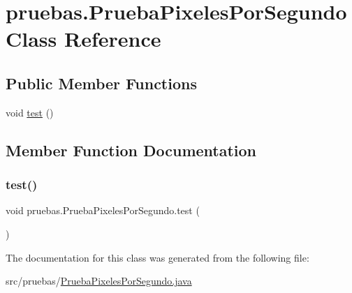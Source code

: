 \hypertarget{classpruebas_1_1_prueba_pixeles_por_segundo}{}\section{pruebas.\+Prueba\+Pixeles\+Por\+Segundo Class Reference}
\label{classpruebas_1_1_prueba_pixeles_por_segundo}
\subsection*{Public Member Functions}
\begin{DoxyCompactItemize}
\item 
void \hyperlink{classpruebas_1_1_prueba_pixeles_por_segundo_ae2ecca9d97a1b65fba11b07b8313a8d7}{test} ()
\end{DoxyCompactItemize}


\subsection{Member Function Documentation}
\hypertarget{classpruebas_1_1_prueba_pixeles_por_segundo_ae2ecca9d97a1b65fba11b07b8313a8d7}{}\label{classpruebas_1_1_prueba_pixeles_por_segundo_ae2ecca9d97a1b65fba11b07b8313a8d7} 
\subsubsection{\texorpdfstring{test()}{test()}}
{\footnotesize\ttfamily void pruebas.\+Prueba\+Pixeles\+Por\+Segundo.\+test (\begin{DoxyParamCaption}{ }\end{DoxyParamCaption})}



The documentation for this class was generated from the following file\+:\begin{DoxyCompactItemize}
\item 
src/pruebas/\hyperlink{_prueba_pixeles_por_segundo_8java}{Prueba\+Pixeles\+Por\+Segundo.\+java}\end{DoxyCompactItemize}
